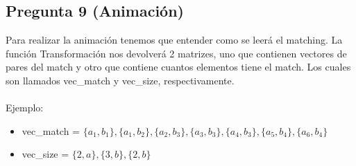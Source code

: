 \documentclass{article}
\begin{document}
		
		\subsection*{Pregunta 9 (Animación)}
		Para realizar la animación tenemos que entender como se leerá el matching.
		La función Transformación nos devolverá 2 matrizes, uno que contienen vectores de pares del match y otro que contiene cuantos elementos tiene el match. Los cuales son llamados vec\_match y vec\_size, respectivamente.
		\\\\
		Ejemplo:
		\begin{itemize}
			\item vec\_match = $\{a_1, b_1\},  \{a_1,b_2\},\{a_2,b_3\},\{a_3,b_3\},\{a_4,b_3\},\{a_5,b_4\},\{a_6,b_4\}$
			\item vec\_size = $\{2,a\},\{3,b\},\{2,b\}$
		\end{itemize}
	
\end{document}
